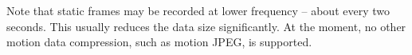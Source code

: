 Note that static frames may be recorded at lower frequency --
about every two seconds.
This usually reduces the data size significantly.
At the moment, no other motion data compression,
such as motion JPEG, is supported. 





